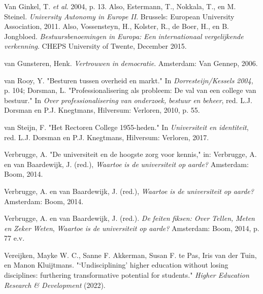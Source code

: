 \documentclass[smallauthor, chapterhaspagenum, nochapterinheader, pagenuminheader,  bigchapnum,medium2, tocpages,  garamond, titleinheader]{jote-book}
\begin{document}
\begin{references}
		Van Ginkel, T. \emph{et al}. 2004, p. 13. Also, Estermann, T., Nokkala, T., en M. Steinel. \emph{University Autonomy in Europe II}. Brussels: European University Association, 2011. Also, Vossensteyn, H., Kolster, R., de Boer, H., en B. Jongbloed. \emph{Bestuursbenoemingen}\emph{ in Europa: }\emph{Een}\emph{ }\emph{internationaal}\emph{ }\emph{vergelijkende}\emph{ }\emph{verkenning}. CHEPS University of Twente, December 2015.



		van Gunsteren, Henk. \emph{Vertrouwen}\emph{ in }\emph{democratie}. Amsterdam: Van Gennep, 2006.



		van Rooy, Y. "Besturen tussen overheid en markt." In \emph{Dorresteijn}\emph{/}\emph{Kessels}\emph{ 2004}, p. 104; Dorsman, L. "Professionalisering als probleem: De val van een college van bestuur." In \emph{Over }\emph{professionalisering}\emph{ van }\emph{onderzoek}\emph{, }\emph{bestuur}\emph{ }\emph{en}\emph{ }\emph{beheer}, red. L.J. Dorsman en P.J. Knegtmans, Hilversum: Verloren, 2010, p. 55.



		van Steijn, F. "Het Rectoren College 1955-heden." In \emph{Universiteit }\emph{en}\emph{ }\emph{identiteit}, red. L.J. Dorsman en P.J. Knegtmans, Hilversum: Verloren, 2017.



		Verbrugge, A. "De universiteit en de hoogste zorg voor kennis," in: Verbrugge, A. en van Baardewijk, J. (red.), \emph{Waartoe}\emph{ is de }\emph{universiteit}\emph{ op }\emph{aarde}\emph{?} Amsterdam: Boom, 2014.



		Verbrugge, A. en van Baardewijk, J. (red.), \emph{Waartoe}\emph{ is de }\emph{universiteit}\emph{ op }\emph{aarde}\emph{?} Amsterdam: Boom, 2014.



		Verbrugge, A. en van Baardewijk, J. (red.). \emph{De }\emph{feiten}\emph{ }\emph{fiksen}\emph{: Over }\emph{Tellen}\emph{, }\emph{Meten}\emph{ }\emph{en}\emph{ }\emph{Zeker}\emph{ }\emph{Weten}, \emph{Waartoe}\emph{ is de }\emph{universiteit}\emph{ op }\emph{aarde}\emph{?} Amsterdam: Boom, 2014, p. 77 e.v.



		Vereijken, Mayke W. C., Sanne F. Akkerman, Susan F. te Pas, Iris van der Tuin, en Manon Kluijtmans. "‘Undisciplining' higher education without losing disciplines: furthering transformative potential for students." \emph{Higher Education Research \& Development} (2022).




\end{references}
\end{document}
